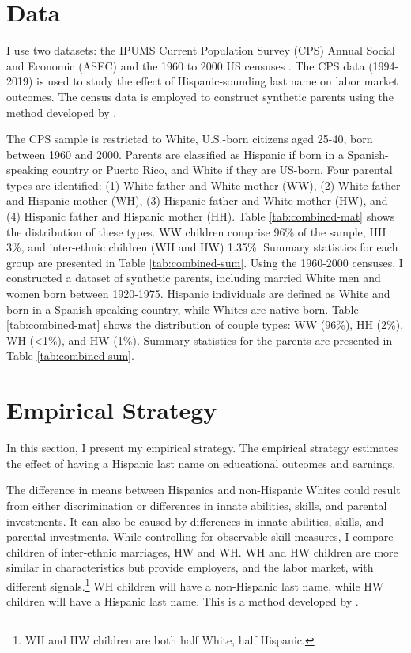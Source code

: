\documentclass[a4paper,fleqn]{cas-sc}
\begin{document}
\section{Data}\label{sec:data}

I use two datasets: the IPUMS Current Population Survey (CPS) Annual Social and Economic (ASEC) \citep{cps2019} and the 1960 to 2000 US censuses \citep{acs2019}. The CPS data (1994-2019) is used to study the effect of Hispanic-sounding last name on labor market outcomes. The census data is employed to construct synthetic parents using the method developed by \citet{rubinstein2014pride}.

The CPS sample is restricted to White, U.S.-born citizens aged 25-40, born between 1960 and 2000. Parents are classified as Hispanic if born in a Spanish-speaking country or Puerto Rico, and White if they are US-born. Four parental types are identified: (1) White father and White mother (WW), (2) White father and Hispanic mother (WH), (3) Hispanic father and White mother (HW), and (4) Hispanic father and Hispanic mother (HH). Table \ref{tab:combined-mat} shows the distribution of these types. WW children comprise 96\% of the sample, HH 3\%, and inter-ethnic children (WH and HW) 1.35\%. Summary statistics for each group are presented in Table \ref{tab:combined-sum}. Using the 1960-2000 censuses, I constructed a dataset of synthetic parents, including married White men and women born between 1920-1975. Hispanic individuals are defined as White and born in a Spanish-speaking country, while Whites are native-born. Table \ref{tab:combined-mat} shows the distribution of couple types: WW (96\%), HH (2\%), WH (<1\%), and HW (1\%). Summary statistics for the parents are presented in Table \ref{tab:combined-sum}.

\section{Empirical Strategy}\label{sec:emp_model}

In this section, I present my empirical strategy. The empirical strategy estimates the effect of having a Hispanic last name on educational outcomes and earnings. 

The difference in means between Hispanics and non-Hispanic Whites could result from either discrimination or differences in innate abilities, skills, and parental investments. It can also be caused by differences in innate abilities, skills, and parental investments. While controlling for observable skill measures, I compare children of inter-ethnic marriages, HW and WH. WH and HW children are more similar in characteristics but provide employers, and the labor market, with different signals.\footnote{WH and HW children are both half White, half Hispanic.} WH children will have a non-Hispanic last name, while HW children will have a Hispanic last name. This is a method developed by \citet{rubinstein2014pride}.
\end{document}
